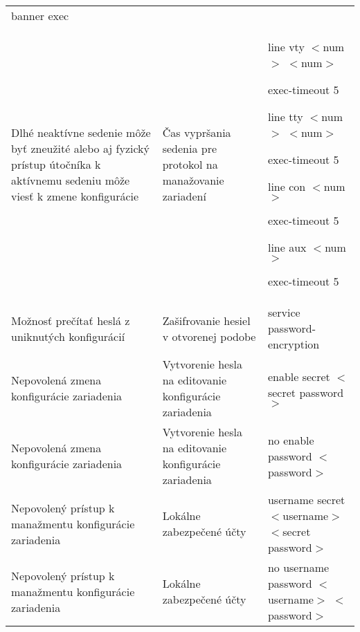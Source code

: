 \begin{longtable}[!htbp]{|L{10em}L{10em}L{34em}|}
	banner exec\\
	
	
	
	Dlhé neaktívne sedenie môže byť zneužité alebo aj fyzický prístup útočníka k aktívnemu sedeniu môže viesť k zmene konfigurácie	&Čas vypršania sedenia pre protokol na manažovanie zariadení	&line vty $<$num$>$ $<$num$>$
	
	exec-timeout 5
	\vspace{0.5em}
	
	line tty $<$num$>$ $<$num$>$
	
	\hspace{0.5em}exec-timeout 5
	\vspace{0.5em}
	
	line con $<$num$>$
	
	\hspace{0.5em}exec-timeout 5
	\vspace{0.5em}
	
	line aux $<$num$>$
	
	\hspace{0.5em}exec-timeout 5\\
	
	
	
	
	 Možnosť prečítať heslá z uniknutých konfigurácií	&Zašifrovanie hesiel v otvorenej podobe	&service password-encryption\\
	
	
	
	
	Nepovolená zmena konfigurácie zariadenia	&Vytvorenie hesla na editovanie konfigurácie zariadenia	&enable secret $<$secret password$>$\\
	
	
	
	
	 Nepovolená zmena konfigurácie zariadenia	&Vytvorenie hesla na editovanie konfigurácie zariadenia	&no enable password $<$password$>$\\
	
	
	
	Nepovolený prístup k manažmentu konfigurácie zariadenia	&Lokálne zabezpečené účty	&username secret $<$username$>$ $<$secret password$>$\\
	
	
	
	 Nepovolený prístup k manažmentu konfigurácie zariadenia	&Lokálne zabezpečené účty	&no username password  $<$username$>$ $<$password$>$\\
	

\end{longtable}
